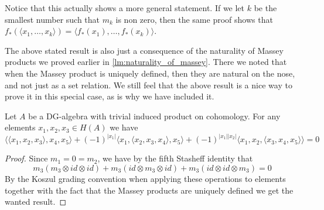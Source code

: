 Notice that this actually shows a more general statement. If we let $k$ be the smallest number such that $m_k$ is non zero, then the same proof shows that $f_*(\langle x_1, \ldots, x_k\rangle) = \langle f_*(x_1), \ldots, f_*(x_k)\rangle$. 

The above stated result is also just a consequence of the naturality of Massey products we proved earlier in \cref{lm:naturality_of_massey}. There we noted that when the Massey product is uniquely defined, then they are natural on the nose, and not just as a set relation. We still feel that the above result is a nice way to prove it in this special case, as is why we have included it.


\begin{proposition}
Let $A$ be a DG-algebra with trivial induced product on cohomology. For any elements $x_1, x_2, x_3 \in H(A)$ we have
\begin{equation*}
    \langle \langle x_1, x_2, x_3\rangle, x_4, x_5\rangle + (-1)^{|x_1|}\langle x_1,\langle x_2, x_3, x_4\rangle, x_5\rangle + (-1)^{|x_1||x_2|}\langle x_1, x_2, \langle x_3, x_4, x_5\rangle\rangle = 0
\end{equation*}
\end{proposition}
\begin{proof}
Since $m_1 = 0 = m_2$, we have by the fifth Stasheff identity that 
\begin{equation*}
    m_3(m_3\otimes id\otimes id)+m_3(id\otimes m_3\otimes id)+m_3(id\otimes id\otimes m_3)=0 
\end{equation*}
By the Koszul grading convention when applying these operations to elements together with the fact that the Massey products are uniquely defined we get the wanted result. 
\end{proof}


\fi
